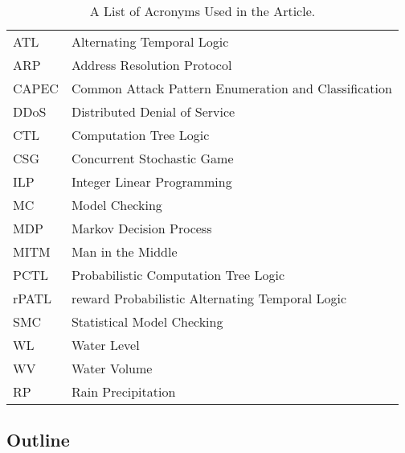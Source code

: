 


\begin{table}[h!]
\centering

\begin{tabular}{|m{1.50cm} l |} 
\hline 
ATL & Alternating Temporal Logic \\
ARP & Address Resolution Protocol \\
CAPEC & Common Attack Pattern Enumeration and Classification \\
DDoS &  Distributed Denial of Service \\
CTL & Computation Tree Logic \\
CSG & Concurrent Stochastic Game \\
ILP & Integer Linear Programming \\
MC & Model Checking \\
MDP & Markov Decision Process \\
MITM & Man in the Middle \\
PCTL & Probabilistic Computation Tree Logic \\
rPATL & reward Probabilistic Alternating Temporal Logic \\
SMC & Statistical Model Checking \\
WL & Water Level \\
WV & Water Volume \\ 
RP & Rain Precipitation \\ 
\hline 
\end{tabular}
\caption{A List of Acronyms Used in the Article.}
\label{tableOfacronyms}
\end{table}
\normalsize

\subsection{Outline} 


